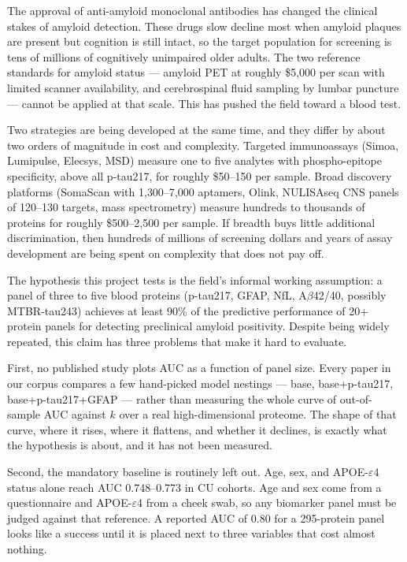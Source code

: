 \documentclass{article}
\begin{document}
The approval of anti-amyloid monoclonal antibodies has changed the clinical
stakes of amyloid detection. These drugs slow decline most when amyloid
plaques are present but cognition is still intact, so the target population
for screening is tens of millions of cognitively unimpaired older adults. The
two reference standards for amyloid status --- amyloid PET at roughly \$5{,}000
per scan with limited scanner availability, and cerebrospinal fluid sampling
by lumbar puncture --- cannot be applied at that scale. This has pushed the
field toward a blood test.

Two strategies are being developed at the same time, and they differ by about
two orders of magnitude in cost and complexity. Targeted immunoassays (Simoa,
Lumipulse, Elecsys, MSD) measure one to five analytes with phospho-epitope
specificity, above all p-tau217, for roughly \$50--150 per sample. Broad
discovery platforms (SomaScan with 1{,}300--7{,}000 aptamers, Olink, NULISAseq
CNS panels of 120--130 targets, mass spectrometry) measure hundreds to
thousands of proteins for roughly \$500--2{,}500 per sample. If breadth buys
little additional discrimination, then hundreds of millions of screening
dollars and years of assay development are being spent on complexity that does
not pay off.

The hypothesis this project tests is the field's informal working assumption:
a panel of three to five blood proteins (p-tau217, GFAP, NfL, A$\beta$42/40,
possibly MTBR-tau243) achieves at least 90\% of the predictive performance of
20+ protein panels for detecting preclinical amyloid positivity. Despite being
widely repeated, this claim has three problems that make it hard to evaluate.

First, no published study plots AUC as a function of panel size. Every paper in
our corpus compares a few hand-picked model nestings --- base, base+p-tau217,
base+p-tau217+GFAP --- rather than measuring the whole curve of out-of-sample
AUC against $k$ over a real high-dimensional proteome. The shape of that curve,
where it rises, where it flattens, and whether it declines, is exactly what the
hypothesis is about, and it has not been measured.

Second, the mandatory baseline is routinely left out. Age, sex, and
APOE-$\varepsilon$4 status alone reach AUC 0.748--0.773 in CU cohorts. Age and
sex come from a questionnaire and APOE-$\varepsilon$4 from a cheek swab, so any
biomarker panel must be judged against that reference. A reported AUC of 0.80
for a 295-protein panel looks like a success until it is placed next to three
variables that cost almost nothing.
\end{document}
